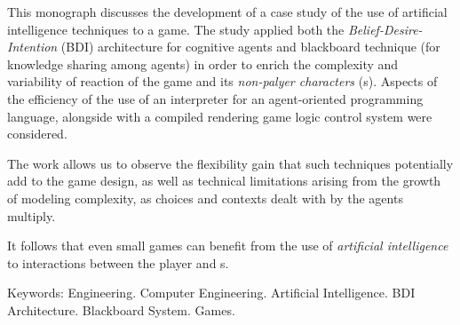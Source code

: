This monograph discusses the development of a case study of the use of artificial intelligence techniques to a game. The study applied both the \emph{Belief-Desire-Intention} (BDI) architecture for cognitive agents and blackboard technique (for knowledge sharing among agents) in order to enrich the complexity and variability of reaction of the game and its \emph{non-palyer characters} (\npc{}s). Aspects of the efficiency of the use of an interpreter for an agent-oriented programming language, alongside with a compiled rendering game logic control system were considered.

The work allows us to observe the flexibility gain that such techniques potentially add to the game design, as well as technical limitations arising from the growth of modeling complexity, as choices and contexts dealt with by the agents multiply.

It follows that even small games can benefit from the use of \emph{artificial intelligence} to interactions between the player and \npc{}s.

Keywords: Engineering. Computer Engineering. Artificial
Intelligence. BDI Architecture. Blackboard System. Games.

